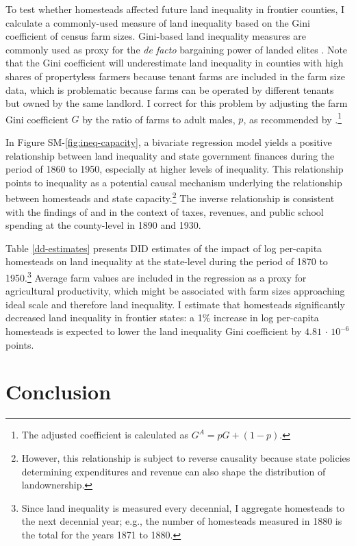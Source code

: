 \documentclass[12pt]{article}
\begin{document}
To test whether homesteads affected future land inequality in frontier counties, I calculate a commonly-used measure of land inequality based on the Gini coefficient of census farm sizes. Gini-based land inequality measures are commonly used as proxy for the \emph{de facto} bargaining power of landed elites \citep[e.g.,][]{boix2003democracy,ziblatt2008does,ansell2015}. Note that the Gini coefficient will underestimate land inequality in counties with high shares of propertyless farmers because tenant farms are included in the farm size data, which is problematic because farms can be operated by different tenants but owned by the same landlord. I correct for this problem by adjusting the farm Gini coefficient $G$ by the ratio of farms to adult males, $p$, as recommended by \citet{vollrath2013inequality}.\footnote{The adjusted coefficient is calculated as $G^A = p G + (1-p)$.} 

In Figure SM-\ref{fig:ineq-capacity}, a bivariate regression model yields a positive relationship between land inequality and state government finances during the period of 1860 to 1950, especially at higher levels of inequality. This relationship points to inequality as a potential causal mechanism underlying the relationship between homesteads and state capacity.\footnote{However, this relationship is subject to reverse causality because state policies determining expenditures and revenue can also shape the distribution of landownership.} The inverse relationship is consistent with the findings of \citet{ramcharan2010inequality} and \citet{vollrath2013inequality} in the context of taxes, revenues, and public school spending at the county-level in 1890 and 1930.

Table \ref{dd-estimates} presents DID estimates of the impact of log per-capita homesteads on land inequality at the state-level during the period of 1870 to 1950.\footnote{Since land inequality is measured every decennial, I aggregate homesteads to the next decennial year; e.g., the number of homesteads measured in 1880 is the total for the years 1871 to 1880.} Average farm values are included in the regression as a proxy for agricultural productivity, which might be associated with farm sizes approaching ideal scale and therefore land inequality. I estimate that homesteads significantly decreased land inequality in frontier states: a 1\% increase in log per-capita homesteads is expected to lower the land inequality Gini coefficient by $4.81\,\cdot\,10^{-6}$ points. 

\section{Conclusion} \label{discussion} 
\end{document}

